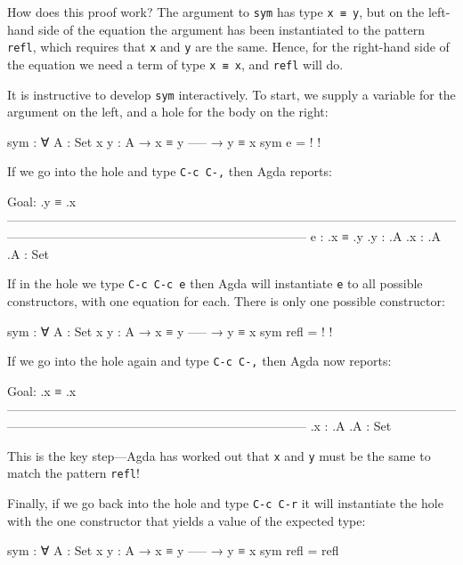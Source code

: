 How does this proof work? The argument to \texttt{sym} has type
\texttt{x\ ≡\ y}, but on the left-hand side of the equation the argument
has been instantiated to the pattern \texttt{refl}, which requires that
\texttt{x} and \texttt{y} are the same. Hence, for the right-hand side
of the equation we need a term of type \texttt{x\ ≡\ x}, and
\texttt{refl} will do.

It is instructive to develop \texttt{sym} interactively. To start, we
supply a variable for the argument on the left, and a hole for the body
on the right:

\begin{myDisplay}
sym : ∀ {A : Set} {x y : A}
  → x ≡ y
    -----
  → y ≡ x
sym e = {! !}
\end{myDisplay}

If we go into the hole and type \texttt{C-c\ C-,} then Agda reports:

\begin{myDisplay}
Goal: .y ≡ .x
————————————————————————————————————————————————————————————
e  : .x ≡ .y
.y : .A
.x : .A
.A : Set
\end{myDisplay}

If in the hole we type \texttt{C-c\ C-c\ e} then Agda will instantiate
\texttt{e} to all possible constructors, with one equation for each.
There is only one possible constructor:

\begin{myDisplay}
sym : ∀ {A : Set} {x y : A}
  → x ≡ y
    -----
  → y ≡ x
sym refl = {! !}
\end{myDisplay}

If we go into the hole again and type \texttt{C-c\ C-,} then Agda now
reports:

\begin{myDisplay}
 Goal: .x ≡ .x
 ————————————————————————————————————————————————————————————
 .x : .A
 .A : Set
\end{myDisplay}

This is the key step---Agda has worked out that \texttt{x} and
\texttt{y} must be the same to match the pattern \texttt{refl}!

Finally, if we go back into the hole and type \texttt{C-c\ C-r} it will
instantiate the hole with the one constructor that yields a value of the
expected type:

\begin{myDisplay}
sym : ∀ {A : Set} {x y : A}
  → x ≡ y
    -----
  → y ≡ x
sym refl = refl
\end{myDisplay}

